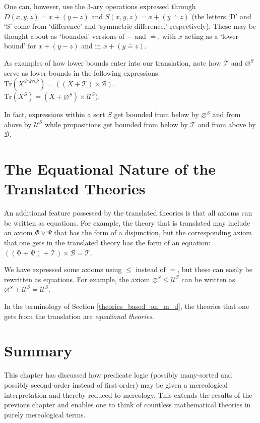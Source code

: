 \documentclass[12pt]{book}
\begin{document}
One can, however, use the 3-ary operations expressed through $D(x, y, z) = x + (y - z)$ and $S(x, y, z) = x + (y \doteq z)$ (the letters `D' and `S' come from `difference' and `symmetric difference,' respectively). These may be thought about as `bounded' versions of $-$ and $\doteq$, with $x$ acting as a `lower bound' for $x + (y - z)$ and in $x + (y \doteq z)$.

As examples of how lower bounds enter into our translation, note how $\mathcal{T}$ and $\varnothing^S$ serve as lower bounds in the following expressions:\\
\indent * $\mathrm{Tr}(X^{\mathcal{PROP}}) = ((X + \mathcal{T}) \times \mathcal{B})$.\\
\indent * $\mathrm{Tr}(X^S) = (X + \varnothing^S) \times \mathcal{U}^S)$.

In fact, expressions within a sort $S$ get bounded from below by $\varnothing^S$ and from above by $\mathcal{U}^S$ while propositions get bounded from below by $\mathcal{T}$ and from above by $\mathcal{B}$.

\section{The Equational Nature of the Translated Theories} \label{equational_theories_from_translation}
An additional feature possessed by the translated theories is that all axioms can be written as equations. For example, the theory that is translated may include an axiom $\Phi \vee \Psi$ that has the form of a disjunction, but the corresponding axiom that one gets in the translated theory has the form of an equation: $((\mathrm{\Phi} + \mathrm{\Psi}) + \mathcal{T}) \times \mathcal{B} = \mathcal{T}$.

We have expressed some axioms using $\le$ instead of $=$, but these can easily be rewritten as equations. For example, the axiom $\varnothing^S \le \mathcal{U}^S$ can be written as $\varnothing^S + \mathcal{U}^S = \mathcal{U}^S$.

In the terminology of Section \ref{theories_based_on_m_d}, the theories that one gets from the translation are \textit{equational theories}.

\section{Summary}
This chapter has discussed how predicate logic (possibly many-sorted and possibly second-order instead of first-order) may be given a mereological interpretation and thereby reduced to mereology. This extends the results of the previous chapter and enables one to think of countless mathematical theories in purely mereological terms.
\end{document}
